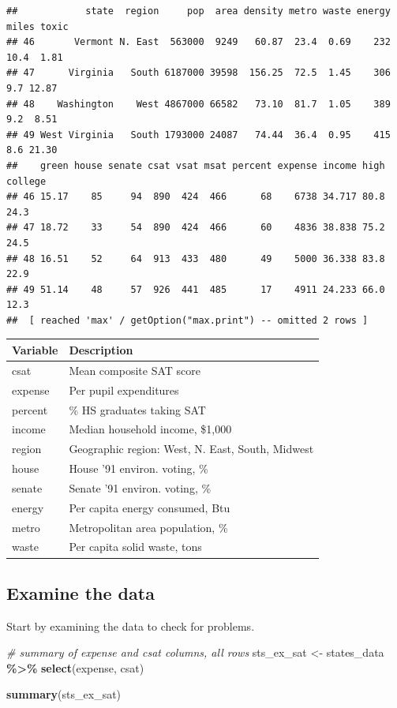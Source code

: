 \documentclass[
]{book}
\newenvironment{Shaded}{\begin{snugshade}}{\end{snugshade}}
\newcommand{\CommentTok}[1]{\textcolor[rgb]{0.56,0.35,0.01}{\textit{#1}}}
\newcommand{\KeywordTok}[1]{\textcolor[rgb]{0.13,0.29,0.53}{\textbf{#1}}}
\newcommand{\NormalTok}[1]{#1}
\newcommand{\OperatorTok}[1]{\textcolor[rgb]{0.81,0.36,0.00}{\textbf{#1}}}
\newcommand{\StringTok}[1]{\textcolor[rgb]{0.31,0.60,0.02}{#1}}
\begin{document}
\begin{verbatim}
##            state  region     pop  area density metro waste energy miles toxic
## 46       Vermont N. East  563000  9249   60.87  23.4  0.69    232  10.4  1.81
## 47      Virginia   South 6187000 39598  156.25  72.5  1.45    306   9.7 12.87
## 48    Washington    West 4867000 66582   73.10  81.7  1.05    389   9.2  8.51
## 49 West Virginia   South 1793000 24087   74.44  36.4  0.95    415   8.6 21.30
##    green house senate csat vsat msat percent expense income high college
## 46 15.17    85     94  890  424  466      68    6738 34.717 80.8    24.3
## 47 18.72    33     54  890  424  466      60    4836 38.838 75.2    24.5
## 48 16.51    52     64  913  433  480      49    5000 36.338 83.8    22.9
## 49 51.14    48     57  926  441  485      17    4911 24.233 66.0    12.3
##  [ reached 'max' / getOption("max.print") -- omitted 2 rows ]
\end{verbatim}

\begin{longtable}[]{@{}ll@{}}
\toprule
Variable & Description\tabularnewline
\midrule
\endhead
csat & Mean composite SAT score\tabularnewline
expense & Per pupil expenditures\tabularnewline
percent & \% HS graduates taking SAT\tabularnewline
income & Median household income, \$1,000\tabularnewline
region & Geographic region: West, N. East, South, Midwest\tabularnewline
house & House '91 environ. voting, \%\tabularnewline
senate & Senate '91 environ. voting, \%\tabularnewline
energy & Per capita energy consumed, Btu\tabularnewline
metro & Metropolitan area population, \%\tabularnewline
waste & Per capita solid waste, tons\tabularnewline
\bottomrule
\end{longtable}

\hypertarget{examine-the-data}{%
\subsection{Examine the data}\label{examine-the-data}}

Start by examining the data to check for problems.

\begin{Shaded}
\begin{Highlighting}[]
  \CommentTok{\# summary of expense and csat columns, all rows}
\NormalTok{  sts\_ex\_sat \textless{}{-}}\StringTok{ }
\StringTok{      }\NormalTok{states\_data }\OperatorTok{\%\textgreater{}\%}\StringTok{ }
\StringTok{      }\KeywordTok{select}\NormalTok{(expense, csat)}
  
  \KeywordTok{summary}\NormalTok{(sts\_ex\_sat)}
\end{Highlighting}
\end{Shaded}
\end{document}
